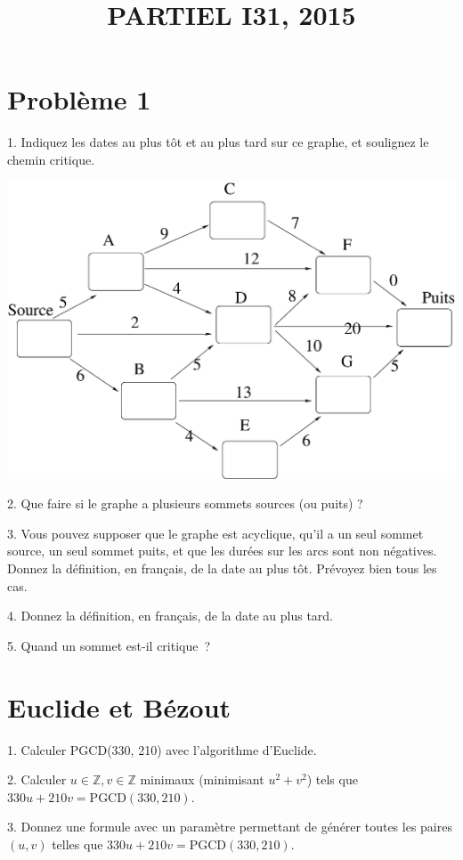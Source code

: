 \documentclass[11pt]{article}
\def\Z{\mathbb Z}
\begin{document}
\title{PARTIEL I31, 2015}
\date{}\maketitle


\section{Problème 1}

1. Indiquez les dates au plus tôt et au plus tard sur ce graphe, 
et soulignez le chemin critique. 

\begin{center}
\includegraphics[width=0.7\linewidth]{critique.eps}
\end{center}

2. Que faire si le graphe a plusieurs sommets sources (ou puits) ?

3. Vous pouvez supposer que le graphe est acyclique, qu'il a un seul sommet source, un seul sommet puits, et que les durées sur les arcs sont non négatives.
Donnez la définition, en français, de la date au plus tôt. Prévoyez bien tous les cas.

4. Donnez la définition, en français, de la date au plus tard.

5. Quand un sommet est-il critique~?

\section{Euclide et Bézout}
1. Calculer PGCD(330, 210) avec l'algorithme d'Euclide.

2. Calculer $u\in \Z, v\in \Z$ minimaux (minimisant $u^2+v^2$) tels que $330u+210v=\mbox{PGCD}(330, 210)$. 

3. Donnez une formule avec un paramètre permettant de générer toutes les paires  $(u, v)$ telles
que $330u+210v=\mbox{PGCD}(330, 210)$.
\end{document}
